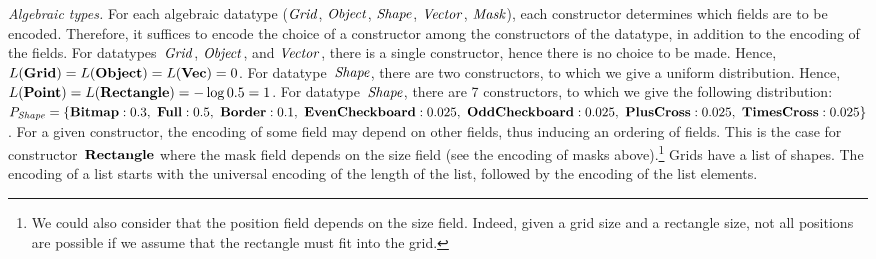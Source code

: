 \documentclass[a4paper]{llncs}
\begin{document}
{\em Algebraic types.} For each algebraic datatype (${\it Grid}$,
${\it Object}$, ${\it Shape}$, ${\it Vector}$, ${\it Mask}$), each
constructor determines which fields are to be encoded. Therefore, it
suffices to encode the choice of a constructor among the constructors
of the datatype, in addition to the encoding of the fields. For
datatypes~${\it Grid}$, ${\it Object}$, and ${\it Vector}$, there is a
single constructor, hence there is no choice to be made. Hence,
$L({\bf Grid}) = L({\bf Object}) = L({\bf Vec}) = 0$. For
datatype~${\it Shape}$, there are two constructors, to which we give a
uniform distribution. Hence,
$L({\bf Point}) = L({\bf Rectangle}) = -\log 0.5 = 1$.  For
datatype~${\it Shape}$, there are 7 constructors, to which we give the
following distribution:
$P_{\it Shape} = \{ {\bf Bitmap}: 0.3,\ {\bf Full}: 0.5,\ {\bf Border}: 0.1,\ {\bf
  EvenCheckboard}: 0.025,\ {\bf OddCheckboard}: 0.025,\ {\bf PlusCross}:
0.025,\ {\bf TimesCross}: 0.025 \}$.
%
For a given constructor, the encoding of some field may depend on
other fields, thus inducing an ordering of fields. This is the case
for constructor~${\bf Rectangle}$ where the mask field depends on the
size field (see the encoding of masks above).\footnote{We could also consider
that the position field depends on the size field. Indeed, given a
grid size and a rectangle size, not all positions are possible if we
assume that the rectangle must fit into the grid.}
%
Grids have a list of shapes. The encoding of a list starts with the
universal encoding of the length of the list, followed by the encoding
of the list elements.
\end{document}

